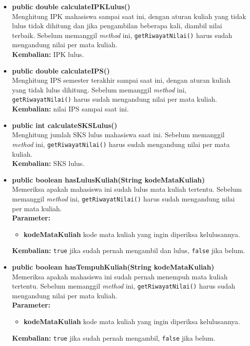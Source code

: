 \begin{enumerate}
\begin{enumerate}
\begin{itemize}
			\item \textbf{public double calculateIPKLulus()}\\
				Menghitung IPK mahasiswa sampai saat ini, dengan aturan kuliah yang tidak lulus tidak dihitung dan jika pengambilan beberapa kali, diambil nilai terbaik. Sebelum memanggil \textit{method} ini, \texttt{getRiwayatNilai()} harus sudah mengandung nilai per mata kuliah.\\
				\textbf{Kembalian:} IPK lulus.
				
			\item \textbf{public double calculateIPS()}\\
				Menghitung IPS semester terakhir sampai saat ini, dengan aturan kuliah yang tidak lulus dihitung. Sebelum memanggil \textit{method} ini, \texttt{getRiwayatNilai()} harus sudah mengandung nilai per mata kuliah.\\
				\textbf{Kembalian:}  nilai IPS sampai saat ini.
				
			\item \textbf{public int calculateSKSLulus()}\\
				Menghitung jumlah SKS lulus mahasiswa saat ini. Sebelum memanggil \textit{method} ini, \texttt{getRiwayatNilai()} harus sudah mengandung nilai per mata kuliah.\\
				\textbf{Kembalian:} SKS lulus.
				
			\item \textbf{public boolean hasLulusKuliah(String kodeMataKuliah)}\\
				Memeriksa apakah mahasiswa ini sudah lulus mata kuliah tertentu. Sebelum memanggil \textit{method} ini, \texttt{getRiwayatNilai()} harus sudah mengandung nilai per mata kuliah.\\
				\textbf{Parameter:}
				\begin{itemize}
					\item \textbf{kodeMataKuliah} kode mata kuliah yang ingin diperiksa kelulusannya.
				\end{itemize}
				\textbf{Kembalian:} \texttt{true} jika sudah pernah mengambil dan lulus, \texttt{false} jika belum.
				
			\item \textbf{public boolean hasTempuhKuliah(String kodeMataKuliah)}\\
				Memeriksa apakah mahasiswa ini sudah pernah menempuh mata kuliah tertentu. Sebelum memanggil \textit{method} ini, \texttt{getRiwayatNilai()} harus sudah mengandung nilai per mata kuliah.\\
				\textbf{Parameter:}
				\begin{itemize}
					\item \textbf{kodeMataKuliah} kode mata kuliah yang ingin diperiksa kelulusannya.
				\end{itemize}
				\textbf{Kembalian:} \texttt{true} jika sudah pernah mengambil, \texttt{false} jika belum.
			

\end{itemize}
\end{enumerate}
\end{enumerate}
